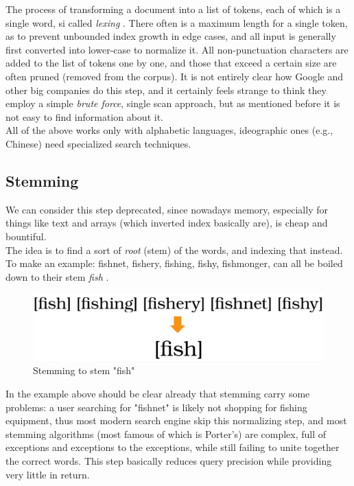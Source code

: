 The process of transforming a document into a list of tokens, each of which is a single word, si called \textit{lexing} . There often is a maximum length for a single token, as to prevent unbounded index growth in edge cases, and all input is generally first converted into lower-case to normalize it. All non-punctuation characters are added to the list of tokens one by one, and those that exceed a certain size are often pruned (removed from the corpus). It is not entirely clear how Google and other big companies do this step, and it certainly feels strange to think they employ a simple \textit{brute force}, single scan approach, but as mentioned before it is not easy to find information about it. \\
All of the above works only with alphabetic languages, ideographic ones (e.g., Chinese) need specialized search techniques. 

\subsection{Stemming}

We can consider this step deprecated, since nowadays memory, especially for things like text and arrays (which inverted index basically are), is cheap and bountiful. \\
The idea is to find a sort of \textit{root} (stem) of the words, and indexing that instead. To make an example: fishnet, fishery, fishing, fishy, fishmonger, can all be boiled down to their stem \textit{fish} . 

\begin{figure}[ht] 
\begin{center}
\includegraphics[width=.8\textwidth]{imgs/stemming.png}
\caption{Stemming to stem "fish"\label{fig:fishstem}}
\end{center}
\end{figure}

In the example above should be clear already that stemming carry some problems: a user searching for "fishnet" is likely not shopping for fishing equipment, thus most modern search engine skip this normalizing step, and most stemming algorithms (most famous of which is Porter's) are complex, full of exceptions and exceptions to the exceptions, while still failing to unite together the correct words. This step basically reduces query precision while providing very little in return.

